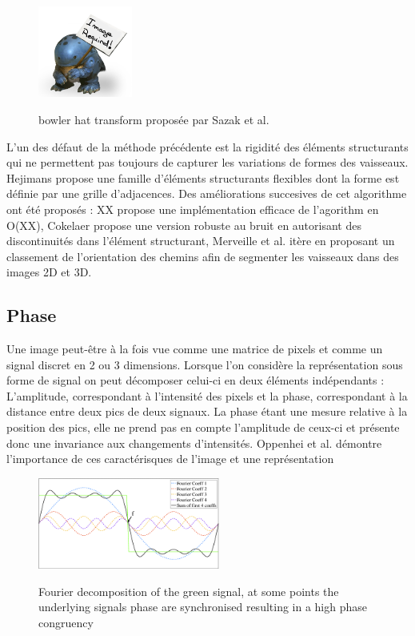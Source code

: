 \begin{figure}
  \centering
  \includegraphics[height=3cm]{Images/img_required.jpg}
  \label{fig:sazak_bowler_hat}
  \caption{bowler hat transform proposée par Sazak et al.}
\end{figure}

L'un des défaut de la méthode précédente est la rigidité des éléments structurants qui ne permettent pas toujours de capturer les variations de formes des vaisseaux. Hejimans \cite{Heijmans2005_path_opening} propose une famille d'éléments structurants flexibles dont la forme est définie par une grille d'adjacences. Des améliorations succesives de cet algorithme ont été proposés : XX propose une implémentation efficace de l'agorithm en O(XX), Cokelaer propose une version robuste au bruit en autorisant des discontinuités dans l'élément structurant, Merveille et al. itère en proposant un classement de l'orientation des chemins afin de segmenter les vaisseaux dans des images 2D et 3D.

\subsection{Phase}
\label{sec:EA:rehaussement:Phase}

Une image peut-être à la fois vue comme une matrice de pixels et comme un signal discret en 2 ou 3 dimensions. Lorsque l'on considère la représentation sous forme de signal on peut décomposer celui-ci en deux éléments indépendants : L'amplitude, correspondant à l'intensité des pixels et la phase, correspondant à la distance entre deux pics de deux signaux. La phase étant une mesure relative à la position des pics, elle ne prend pas en compte l'amplitude de ceux-ci et présente donc une invariance aux changements d'intensités. Oppenhei et al. \cite{Oppenheim1981_phase_importance} démontre l'importance de ces caractérisques de l'image et une représentation 

\begin{figure}
  \centering
  \includegraphics[height=3cm]{Images/PC_decomposition.png}
  \label{fig:phase congruency}
  \caption{Fourier decomposition of the green signal, at some points the underlying signals phase are synchronised resulting in a high phase congruency}
\end{figure}


